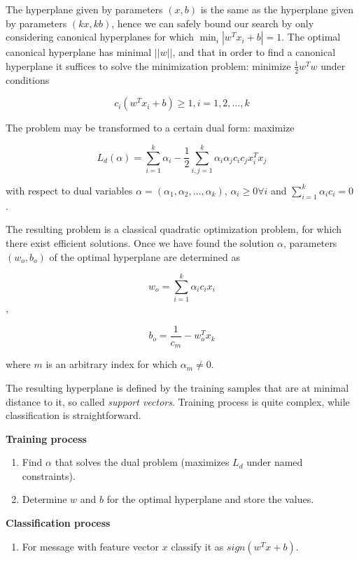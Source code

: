 \documentclass[12pt]{report}
\begin{document}
The hyperplane given by parameters $(x, b)$ is the same as the hyperplane given by parameters $(kx, kb)$, hence we can safely bound our search by only considering canonical hyperplanes for which $\min_i |w^T x_i + b| = 1$. The optimal canonical hyperplane has minimal $||w||$, and that in order to find a canonical hyperplane it suffices to solve the minimization problem: minimize $\frac{1}{2} w^T w$ under conditions

$$c_i(w^T x_i + b) \ge 1, i = 1, 2, \dots, k$$

The problem may be transformed to a certain dual form: maximize

$$L_d(\alpha) = \sum_{i = 1}^{k} \alpha_i - \frac{1}{2} \sum_{i, j = 1}^{k} \alpha_i \alpha_j c_i c_j x_i^T x_j$$

with respect to dual variables $\alpha = (\alpha_1, \alpha_2, \dots, \alpha_k)$, $\alpha_i \ge 0 \forall i$ and $\sum_{i = 1}^{k} \alpha_i c_i = 0$ \cite{Cristianini}.

The resulting problem is a classical quadratic optimization problem, for which there exist efficient solutions. Once we have found the solution $\alpha$, parameters $(w_o, b_o)$ of the optimal hyperplane are determined as

$$w_o = \sum_{i = 1}^{k} \alpha_i c_i x_i$$,

$$b_o = \frac{1}{c_m} - w_o^T x_k$$

where $m$ is an arbitrary index for which $\alpha_m \ne 0$.

The resulting hyperplane is defined by the training samples that are at minimal distance to it, so called \textit{support vectors}. Training process is quite complex, while classification is straightforward.

\textbf{Training process}

\begin{enumerate}
	\item Find $\alpha$ that solves the dual problem (maximizes $L_d$ under named
	constraints).
	\item Determine $w$ and $b$ for the optimal hyperplane and store the values.
\end{enumerate}

\textbf{Classification process}

\begin{enumerate}
	\item For message with feature vector $x$ classify it as $sign(w^T x + b)$.
\end{enumerate}
\end{document}
